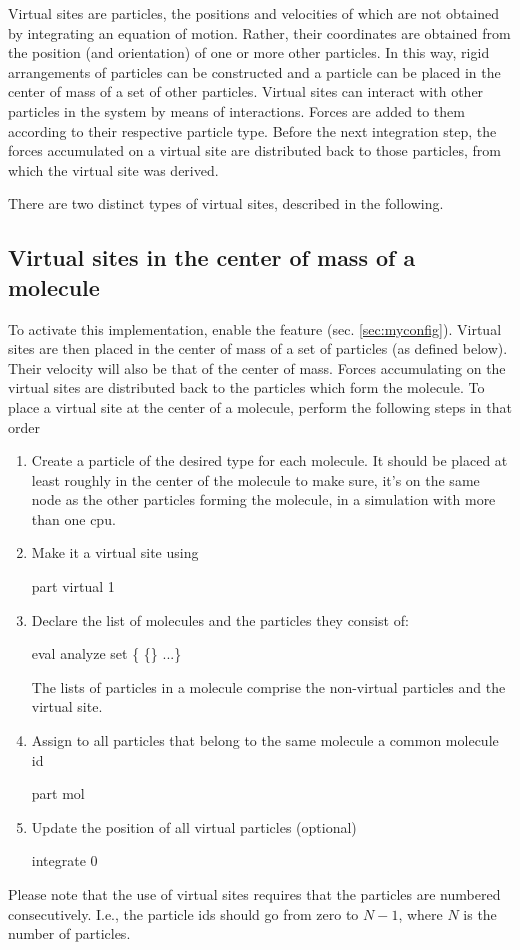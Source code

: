 Virtual sites are particles, the positions and velocities of which are
not obtained by integrating an equation of motion.  Rather, their
coordinates are obtained from the position (and orientation) of one or
more other particles. In this way, rigid arrangements of particles can
be constructed and a particle can be placed in the center of mass of a
set of other particles.  Virtual sites can interact with other
particles in the system by means of interactions. Forces are added to
them according to their respective particle type. Before the next
integration step, the forces accumulated on a virtual site are
distributed back to those particles, from which the virtual site was
derived.

There are two distinct types of virtual sites, described in the
following.

\subsection{Virtual sites in the center of mass of a molecule}

To activate this implementation, enable the feature
 (sec. \ref{sec:myconfig}).  Virtual sites
are then placed in the center of mass of a set of particles (as
defined below). Their velocity will also be that of the center of
mass. Forces accumulating on the virtual sites are distributed back to
the particles which form the molecule.  To place a virtual site at the
center of a molecule, perform the following steps in that order
\begin{enumerate}
\item Create a particle of the desired type for each molecule. It
  should be placed at least roughly in the center of the molecule to
  make sure, it's on the same node as the other particles forming the
  molecule, in a simulation with more than one cpu.
\item Make it a virtual site using 
  \begin{essyntaxbox}
    part  virtual 1
  \end{essyntaxbox}
\item Declare the list of molecules and the particles they consist of:
  \begin{essyntaxbox}
    eval analyze set \{ \{\} ...\}
  \end{essyntaxbox}
  The lists of particles in a molecule comprise the non-virtual
  particles and the virtual site.
\item Assign to all particles that belong to the same molecule a
  common molecule id
  \begin{essyntaxbox}
    part  mol 
  \end{essyntaxbox}
\item Update the position of all virtual particles (optional)
  \begin{essyntaxbox}
    integrate 0
  \end{essyntaxbox}
\end{enumerate}
Please note that the use of virtual sites requires that the particles are numbered consecutively. I.e., the particle ids should go from zero to $N-1$, where $N$ is the number of particles.


